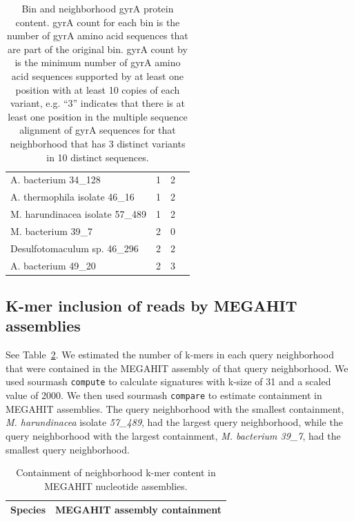 \begin{table}
{\begin{tabular}{@{}l l c c @{}}
    A. bacterium 34\_128 & 1 & 2 \\
    A. thermophila isolate 46\_16 & 1 & 2 \\
    M. harundinacea isolate 57\_489 & 1 & 2 \\
    M. bacterium 39\_7 & 2 & 0 \\
    Desulfotomaculum sp. 46\_296 & 2 & 2 \\
    A. bacterium 49\_20 & 2 & 3 \\
    \bottomrule
  \end{tabular}
  \caption{  \label{tab:gyrAcounts}%
   Bin and neighborhood gyrA protein content. gyrA count for each bin is the number
    of gyrA amino acid sequences that are part of the original bin. gyrA count by \plass is
    the minimum number of gyrA amino acid sequences supported by at least one
    position with at least 10 copies of each variant, e.g. ``3'' indicates that
    there is at least one position in the multiple sequence alignment of gyrA
    sequences for that neighborhood that has 3 distinct variants in 10 distinct
    sequences.}
  }
\end{table}

\subsection{K-mer inclusion of reads by MEGAHIT assemblies}
\label{subsec:inclusion}

See Table~\ref{tab:kmer_inclusion}. We estimated the number of k-mers in each
query neighborhood that were contained in the MEGAHIT assembly of that query
neighborhood. We used sourmash {\tt compute} to calculate signatures with k-size of
31 and a scaled value of 2000. We then used sourmash {\tt compare} to estimate
containment in MEGAHIT assemblies. The query neighborhood with the smallest 
containment, \emph{M. harundinacea} isolate \emph{57\_489}, had the largest query
neighborhood, while the query neighborhood with the largest containment,
\emph{M. bacterium 39\_7}, had the smallest query neighborhood.  

\begin{table}
  \begin{tabular}{l c}
    \toprule
    Species & MEGAHIT assembly containment \\
    \midrule
    
%    
    \bottomrule
  \end{tabular}
  \caption{Containment of neighborhood k-mer content in MEGAHIT nucleotide assemblies.}
  \label{tab:kmer_inclusion}
\end{table}

